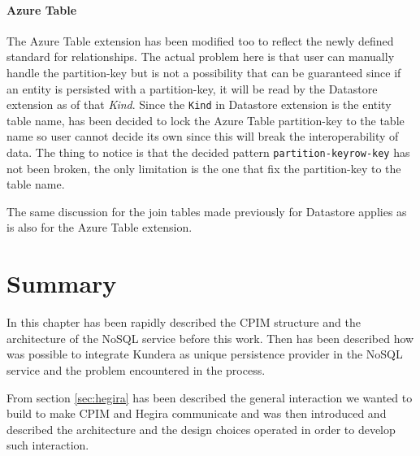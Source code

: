 \paragraph{Azure Table} The Azure Table extension has been modified too to reflect the newly defined standard for relationships. The actual problem here is that user can manually handle the partition-key but is not a possibility that can be guaranteed since if an entity is persisted with a partition-key, it will be read by the Datastore extension as of that \textit{Kind}.
Since the \texttt{Kind} in Datastore extension is the entity table name, has been decided to lock the Azure Table partition-key to the table name so user cannot decide its own since this will break the interoperability of data.
The thing to notice is that the decided pattern \texttt{partition-key\textunderscore row-key} has not been broken, the only limitation is the one that fix the partition-key to the table name.

\noindent The same discussion for the join tables made previously for Datastore applies as is also for the Azure Table extension.

\section{Summary}
In this chapter has been rapidly described the CPIM structure and the architecture of the NoSQL service before this work. Then has been described how was possible to integrate Kundera as unique persistence provider in the NoSQL service and the problem encountered in the process.

\noindent From section \ref{sec:hegira} has been described the general interaction we wanted to build to make CPIM and Hegira communicate and was then introduced and described the architecture and the design choices operated in order to develop such interaction. 
